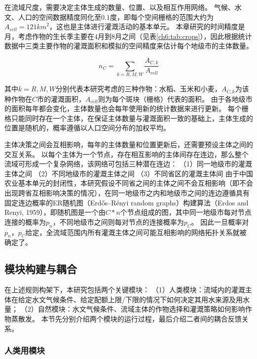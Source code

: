 在流域尺度，需要决定主体生成的数量、位置、以及相互作用网络。
气候、水文、人口的空间数据精度同化至$0.1$度，即每个空间栅格的范围大约为$A_{cell} = 121{km}^2$，这也是主体进行灌溉活动的基本单元。
本章研究的时间精度是月，考虑作物的生长季主要在$4$月到$8$月之间（见表\ref{ch6:tab:crops}），因此根据统计数据中三类主要作物的灌溉面积和模拟的空间精度来估计每个地级市的主体数量。

\begin{equation}
    n_{C} = \sum_{k=R, M, W}\frac{A_{C, k}}{A_{cell}}
\end{equation}

其中$k = R, M, W$分别代表本研究考虑的三种作物：水稻、玉米和小麦，$A_{C, k}$为该种作物在$C$市的灌溉面积，$A_{cell}$则为每个斑块（栅格）代表的面积。
由于各地级市的面积每年都会变化，主体数量也会每年使用新的统计数据来进行更新。
每个栅格只能同时存在一个主体，在保证主体数量与灌溉面积一致的基础上，主体生成的位置是随机的，概率遵循以人口空间分布的加权平均。

主体决策之间会互相影响，每年的主体数量和位置更新后，还需要预设主体之间的交互关系。
以每个主体为一个节点，存在相互影响的主体间存在连边，那么整个流域可形成一个复杂网络，该网络可包括三种潜在连边：
（1）同一地级市的灌溉主体之间
（2）不同地级市的灌溉主体之间
（3）不同省区的灌溉主体间
由于中国农业基本单元的封闭性，本研究假设不同省之间的主体之间不会互相影响（即不会出现跨省互相影响决策的情况），在同一地级市之内和地级市之间的连边遵循具有固定连边概率的ER随机图（Erdős–Rényi random graphs）构建算法（Erdos and Renyi, 1959），即随机图是一个由$C * n$个节点组成的图，其中同一地级市每对节点连接的概率为$p_n$，不同地级市之间则每对节点的连接概率为$p_C$。
因此一旦概率对$p_n$，$p_C$给定，全流域范围内所有灌溉主体之间可能互相影响的网络拓扑关系就被确定了。

\subsection{模块构建与耦合}

在上述规则构架下，本研究包括两个关键模块：
（1）人类模块：流域内的灌溉主体在给定水文气候条件、给定配额上限/下限的情况下如何决定其用水来源及用水量；
（2）自然模块：水文气候条件、流域主体的作物选择和灌溉策略如何影响作物蒸散发。
本节先分别介绍两个模块的运行过程，最后介绍二者间的耦合反馈关系。

\subsubsection*{人类用模块}\label{ch6:sec:society}

